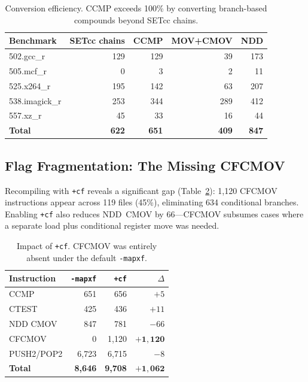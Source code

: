 \documentclass[acmsmall,nonacm]{acmart}
\begin{document}
\begin{table}[t]
  \caption{Conversion efficiency. CCMP exceeds 100\% by converting
    branch-based compounds beyond SETcc chains.}
  \label{tab:conversion}
  \footnotesize
  \begin{tabular}{lrrrr}
    \toprule
    Benchmark & SETcc chains & CCMP & MOV+CMOV & NDD \\
    \midrule
    502.gcc\_r    & 129 & 129 & 39  & 173 \\
    505.mcf\_r    & 0   & 3   & 2   & 11  \\
    525.x264\_r   & 195 & 142 & 63  & 207 \\
    538.imagick\_r & 253 & 344 & 289 & 412 \\
    557.xz\_r     & 45  & 33  & 16  & 44  \\
    \midrule
    \textbf{Total} & \textbf{622} & \textbf{651}
      & \textbf{409} & \textbf{847} \\
    \bottomrule
  \end{tabular}
\end{table}

\subsection{Flag Fragmentation: The Missing CFCMOV}

Recompiling with \texttt{+cf} reveals a significant gap
(Table~\ref{tab:cfcmov}): 1,120 CFCMOV instructions appear across
119 files (45\%), eliminating 634 conditional branches. Enabling
\texttt{+cf} also reduces NDD~CMOV by 66---CFCMOV subsumes cases
where a separate load plus conditional register move was needed.

\begin{table}[t]
  \caption{Impact of \texttt{+cf}. CFCMOV was entirely absent under
    the default \texttt{-mapxf}.}
  \label{tab:cfcmov}
  \footnotesize
  \begin{tabular}{lrrr}
    \toprule
    Instruction & \texttt{-mapxf} & \texttt{+cf} & $\Delta$ \\
    \midrule
    CCMP      & 651   & 656   & $+5$      \\
    CTEST     & 425   & 436   & $+11$     \\
    NDD CMOV  & 847   & 781   & $-66$     \\
    CFCMOV    & 0     & 1,120 & $\mathbf{+1{,}120}$ \\
    PUSH2/POP2 & 6,723 & 6,715 & $-8$      \\
    \midrule
    \textbf{Total} & \textbf{8,646} & \textbf{9,708} & $\mathbf{+1{,}062}$ \\
    \bottomrule
  \end{tabular}
\end{table}
\end{document}

